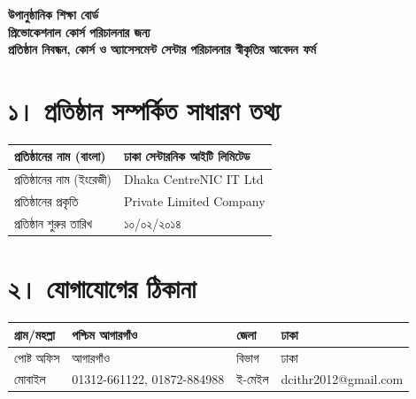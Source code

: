 \documentclass{article}
\begin{document}
\begin{center}
    \textbf{\Large উপানুষ্ঠানিক শিক্ষা বোর্ড} \\
    \textbf{প্রিভোকেশনাল কোর্স পরিচালনার জন্য} \\
    \textbf{প্রতিষ্ঠান নিবন্ধন, কোর্স ও অ্যাসেসমেন্ট সেন্টার পরিচালনার স্বীকৃতির আবেদন ফর্ম}
\end{center}

\vspace{0.5cm}

\section*{১। প্রতিষ্ঠান সম্পর্কিত সাধারণ তথ্য}
\begin{tabularx}{\textwidth}{|l|X|}
    \hline
    প্রতিষ্ঠানের নাম (বাংলা) & ঢাকা সেন্টারনিক আইটি লিমিটেড \\ \hline
    প্রতিষ্ঠানের নাম (ইংরেজী) & Dhaka CentreNIC IT Ltd \\ \hline
    প্রতিষ্ঠানের প্রকৃতি & Private Limited Company \\ \hline
    প্রতিষ্ঠান শুরুর তারিখ & ১০/০২/২০১৪ \\ \hline
\end{tabularx}

\section*{২। যোগাযোগের ঠিকানা}
\begin{tabularx}{\textwidth}{|l|X|l|X|}
    \hline
    গ্রাম/মহল্লা & পশ্চিম আগারগাঁও & জেলা & ঢাকা \\ \hline
    পোষ্ট অফিস & আগারগাঁও & বিভাগ & ঢাকা \\ \hline
    মোবাইল & 01312-661122, 01872-884988 & ই-মেইল & dcithr2012@gmail.com \\ \hline
\end{tabularx}
\end{document}
